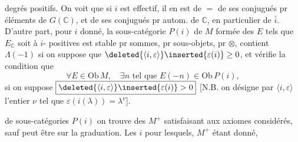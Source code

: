 degrés positifs. On voit que si $i$ est effectif, il en est de $=$ de ses conjugués pr éléments de $G(\mathbb{C})$, et de ses conjugués pr autom. de $\mathbb{C}$, en particulier de $\bar i$. D'autre part, pour $i$ donné, la sous-catégorie  $P(i)$ de $M$ formée des $E$ tels que $E_{\mathbb{C}}$ soit à $i$- positives est  stable pr \deleted{$\unsure{\otimes}$} sommes, pr  sous-objets, pr $\otimes$, contient  $\Lambda(-1)$ si on suppose que  $\deleted{\langle i,\varepsilon\rangle}\inserted{\varepsilon(i)}\geq0$, et vérifie la condition que
\[
\forall E\in\mathrm{Ob}\,M,\quad \exists n\text{ tel que }E(-n)\in\mathrm{Ob}\,P(i),
\]
si on suppose $\boxed{\deleted{\langle i,\varepsilon\rangle}\inserted{\varepsilon(i)}>0}$ [N.B. on désigne par $\langle i,\varepsilon\rangle$ l'entier $\nu$ tel que $\varepsilon(i(\lambda))=\lambda^\nu$].

 de sous-catégories $P(i)$ on trouve des $M^+$ satisfaisant aux axiomes considérés, sauf peut être  sur la graduation.
Les $i$ pour lesquels, $M^+$ étant donné,

